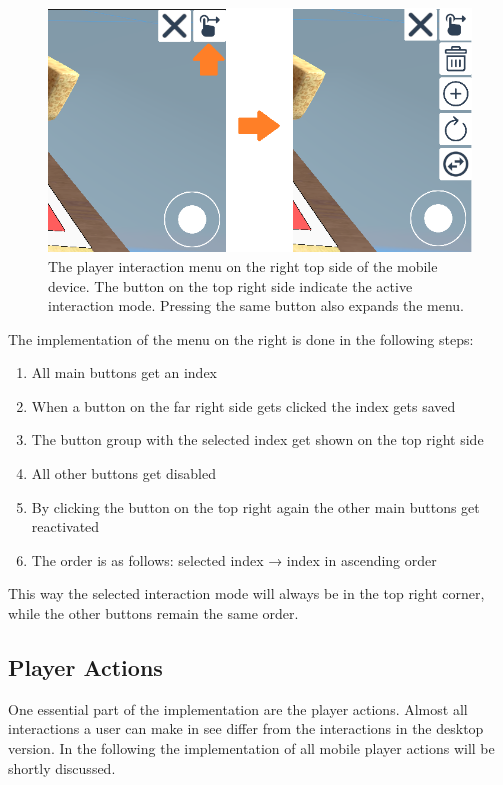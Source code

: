 \begin{figure}[htb]
    \centering
    \includegraphics[width=1\textwidth]{Implementation/img/menu.png}
    \caption{The player interaction menu on the right top side of the mobile device. The button on the top right side indicate the active interaction mode. Pressing the same button also expands the menu.}\label{fig:interaction_menu}
\end{figure}

The implementation of the menu on the right is done in the following steps:
\begin{enumerate}
    \item All main buttons get an index
    \item When a button on the far right side gets clicked the index gets saved
    \item The button group with the selected index get shown on the top right side
    \item All other buttons get disabled
    \item By clicking the button on the top right again the other main buttons get reactivated 
    \item The order is as follows: selected index → index in ascending order
\end{enumerate} 
This way the selected interaction mode will always be in the top right corner, while the other buttons remain the same order.

\subsection{Player Actions}
\label{sec:player_actions}

One essential part of the implementation are the player actions. 
Almost all interactions a user can make in \gls{see} differ from the interactions in the desktop version.
In the following the implementation of all mobile player actions will be shortly discussed.

